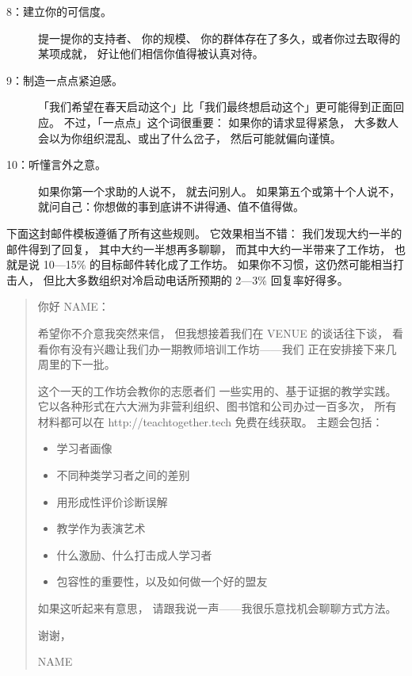 \begin{description}
\item[8：建立你的可信度。]
  提一提你的支持者、
  你的规模、
  你的群体存在了多久，或者你过去取得的某项成就，
  好让他们相信你值得被认真对待。

\item[9：制造一点点紧迫感。]
  「我们希望在春天启动这个」比「我们最终想启动这个」更可能得到正面回应。
  不过，「一点点」这个词很重要：
  如果你的请求显得紧急，
  大多数人会以为你组织混乱、或出了什么岔子，
  然后可能就偏向谨慎。

\item[10：听懂言外之意。]
  如果你第一个求助的人说不，
  就去问别人。
  如果第五个或第十个人说不，
  就问自己：你想做的事到底讲不讲得通、值不值得做。

\end{description}

下面这封邮件模板遵循了所有这些规则。
它效果相当不错：
我们发现大约一半的邮件得到了回复，
其中大约一半想再多聊聊，
而其中大约一半带来了工作坊，
也就是说 10—15\% 的目标邮件转化成了工作坊。
如果你不习惯，这仍然可能相当打击人，
但比大多数组织对冷启动电话所预期的 2—3\% 回复率好得多。

\begin{quote}

  \noindent
  你好 NAME：

  希望你不介意我突然来信，
  但我想接着我们在 VENUE 的谈话往下谈，
  看看你有没有兴趣让我们办一期教师培训工作坊——我们
  正在安排接下来几周里的下一批。

  这个一天的工作坊会教你的志愿者们
  一些实用的、基于证据的教学实践。
  它以各种形式在六大洲为非营利组织、图书馆和公司办过一百多次，
  所有材料都可以在 http://teachtogether.tech 免费在线获取。
  主题会包括：

  \begin{itemize}
  \item 学习者画像
  \item 不同种类学习者之间的差别
  \item 用形成性评价诊断误解
  \item 教学作为表演艺术
  \item 什么激励、什么打击成人学习者
  \item 包容性的重要性，以及如何做一个好的盟友
  \end{itemize}
  
  如果这听起来有意思，
  请跟我说一声——我很乐意找机会聊聊方式方法。

  谢谢，

  NAME

\end{quote}

